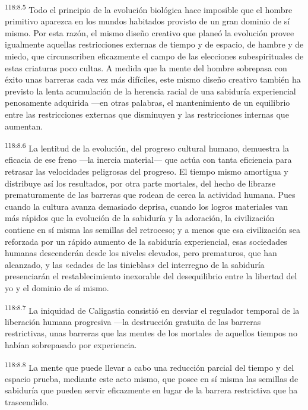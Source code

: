 \par
\textsuperscript{118:8.5} Todo el principio de la evolución biológica hace imposible que el hombre primitivo aparezca en los mundos habitados provisto de un gran dominio de sí mismo. Por esta razón, el mismo diseño creativo que planeó la evolución provee igualmente aquellas restricciones externas de tiempo y de espacio, de hambre y de miedo, que circunscriben eficazmente el campo de las elecciones subespirituales de estas criaturas poco cultas. A medida que la mente del hombre sobrepasa con éxito unas barreras cada vez más difíciles, este mismo diseño creativo también ha previsto la lenta acumulación de la herencia racial de una sabiduría experiencial penosamente adquirida ---en otras palabras, el mantenimiento de un equilibrio entre las restricciones externas que disminuyen y las restricciones internas que aumentan.

\par
\textsuperscript{118:8.6} La lentitud de la evolución, del progreso cultural humano, demuestra la eficacia de ese freno ---la inercia material--- que actúa con tanta eficiencia para retrasar las velocidades peligrosas del progreso. El tiempo mismo amortigua y distribuye así los resultados, por otra parte mortales, del hecho de librarse prematuramente de las barreras que rodean de cerca la actividad humana. Pues cuando la cultura avanza demasiado deprisa, cuando los logros materiales van más rápidos que la evolución de la sabiduría y la adoración, la civilización contiene en sí misma las semillas del retroceso; y a menos que esa civilización sea reforzada por un rápido aumento de la sabiduría experiencial, esas sociedades humanas descenderán desde los niveles elevados, pero prematuros, que han alcanzado, y las «edades de las tinieblas» del interregno de la sabiduría presenciarán el restablecimiento inexorable del desequilibrio entre la libertad del yo y el dominio de sí mismo.

\par
\textsuperscript{118:8.7} La iniquidad de Caligastia consistió en desviar el regulador temporal de la liberación humana progresiva ---la destrucción gratuita de las barreras restrictivas, unas barreras que las mentes de los mortales de aquellos tiempos no habían sobrepasado por experiencia.

\par
\textsuperscript{118:8.8} La mente que puede llevar a cabo una reducción parcial del tiempo y del espacio prueba, mediante este acto mismo, que posee en sí misma las semillas de sabiduría que pueden servir eficazmente en lugar de la barrera restrictiva que ha trascendido.

